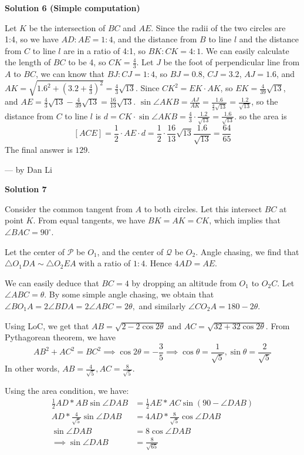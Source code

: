 \begin{enumerate}
 



\textbf{Solution 6 (Simple computation)}

Let $K$ be the intersection of $BC$ and $AE$. Since the radii of the two circles are 1:4, so we have $AD:AE=1:4$, and the distance from $B$ to line $l$ and the distance from $C$ to line $l$ are in a ratio of 4:1, so $BK:CK=4:1$. We can easily calculate the length of $BC$ to be 4, so $CK=\frac{4}{3}$. Let $J$ be the foot of perpendicular line from $A$ to $BC$, we can know that $BJ:CJ=1:4$, so $BJ = 0.8$, $CJ=3.2$, $AJ=1.6$, and $AK=\sqrt{1.6^2+\left(3.2+\frac{4}{3}\right)^2}=\frac{4}{3}\sqrt{13}$. Since $CK^2 = EK\cdot AK$, so $EK=\frac{4}{39}\sqrt{13}$, and $AE = \frac{4}{3}\sqrt{13} - \frac{4}{39}\sqrt{13}= \frac{16}{13}\sqrt{13}$. $\sin\angle AKB=\frac{AJ}{AK} = \frac{1.6}{\frac{4}{3}\sqrt{13}}=\frac{1.2}{\sqrt{13}}$, so the distance from $C$ to line $l$ is $d=CK\cdot \sin\angle AKB = \frac{4}{3}\cdot \frac{1.2}{\sqrt{13}}=\frac{1.6}{\sqrt{13}}$. so the area is
 \[[ACE] = \frac{1}{2}\cdot AE\cdot d = \frac{1}{2}\cdot\frac{16}{13}\sqrt{13}\frac{1.6}{\sqrt{13}} = \frac{64}{65}\]The final answer is $\boxed{129}$.

 --- by Dan Li

 



\textbf{Solution 7}

Consider the common tangent from $A$ to both circles. Let this intersect $BC$ at point $K$. From equal tangents, we have $BK=AK=CK$, which implies that $\angle BAC = 90^\circ$.

 Let the center of $\mathcal{P}$ be $O_1$, and the center of $\mathcal{Q}$ be $O_2$. Angle chasing, we find that $\triangle O_1DA \sim \triangle O_2EA$ with a ratio of $1:4$. Hence $4AD = AE$.

 We can easily deduce that $BC=4$ by dropping an altitude from $O_1$ to $O_2C$. Let $\angle ABC = \theta$. By some simple angle chasing, we obtain that $\angle BO_1A = 2\angle BDA = 2\angle ABC = 2\theta,$ and similarly $\angle CO_2A = 180 - 2\theta$.

 Using LoC, we get that $AB = \sqrt{2-2\cos2\theta}$ and $AC = \sqrt{32+32\cos2\theta}$. From Pythagorean theorem, we have 
 \[AB^2 + AC^2 = BC^2 \implies \cos 2\theta = -\frac{3}{5} \implies \cos \theta = \frac{1}{\sqrt5}, \sin \theta = \frac{2}{\sqrt 5}\]In other words, $AB = \frac{4}{\sqrt5}, AC = \frac{8}{\sqrt5}$.

 Using the area condition, we have:
 \begin{align*} \frac12 AD*AB \sin \angle DAB &= \frac 12 AE*AC \sin(90-\angle DAB) \\ AD*\frac{4}{\sqrt5} \sin \angle DAB &= 4AD*\frac{8}{\sqrt5} \cos \angle DAB \\ \sin \angle DAB &= 8 \cos \angle DAB \\ \implies \sin \angle DAB &= \frac{8}{\sqrt{65}} \end{align*}



\end{enumerate}
